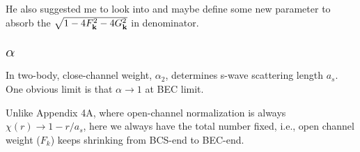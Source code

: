 He also suggested me to look into  and maybe define some new parameter to absorb the $\sqrt{1-4 F_{\mathbf{k}}^2-4 G_{\mathbf{k}}^2}$ in denominator.  

\subsection{$\alpha$}
In two-body, close-channel weight, $\alpha_{2}$, determines s-wave scattering length $a_{s}$.  One obvious limit is that $\alpha\rightarrow1$ at BEC limit.  

Unlike \cite{Leggett} Appendix 4A, where open-channel normalization is always $\chi(r)\rightarrow1-r/a_{s}$, here we always have the total number fixed, i.e., open channel weight ($F_{k}$) keeps shrinking from BCS-end to BEC-end. 